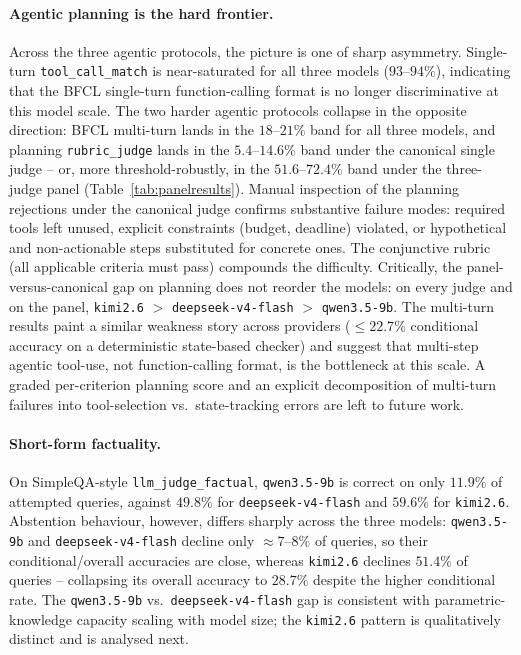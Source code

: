 \documentclass[11pt,a4paper]{article}
\begin{document}
\paragraph{Agentic planning is the hard frontier.} Across the three agentic
protocols, the picture is one of sharp asymmetry. Single-turn
\texttt{tool\_call\_match} is near-saturated for all three models ($93$--$94\%$),
indicating that the BFCL single-turn function-calling format is no longer
discriminative at this model scale. The two harder agentic protocols collapse
in the opposite direction: BFCL multi-turn lands in the $18$--$21\%$ band for
all three models, and planning \texttt{rubric\_judge} lands in the
$5.4$--$14.6\%$ band under the canonical single judge -- or, more
threshold-robustly, in the $51.6$--$72.4\%$ band under the three-judge panel
(Table~\ref{tab:panelresults}). Manual inspection of the planning rejections
under the canonical judge confirms substantive failure modes: required tools
left unused, explicit constraints (budget, deadline) violated, or hypothetical
and non-actionable steps substituted for concrete ones. The conjunctive rubric
(all applicable criteria must pass) compounds the difficulty. Critically, the
panel-versus-canonical gap on planning does not reorder the models: on every
judge and on the panel, \texttt{kimi2.6} $>$ \texttt{deepseek-v4-flash} $>$
\texttt{qwen3.5-9b}. The multi-turn results paint a similar weakness story
across providers ($\le 22.7\%$ conditional accuracy on a deterministic
state-based checker) and suggest that multi-step agentic tool-use, not
function-calling format, is the bottleneck at this scale. A graded
per-criterion planning score and an explicit decomposition of multi-turn
failures into tool-selection vs.\ state-tracking errors are left to future
work.

\paragraph{Short-form factuality.} On SimpleQA-style \texttt{llm\_judge\_factual},
\texttt{qwen3.5-9b} is correct on only $11.9\%$ of attempted queries, against
$49.8\%$ for \texttt{deepseek-v4-flash} and $59.6\%$ for \texttt{kimi2.6}.
Abstention behaviour, however, differs sharply across the three models:
\texttt{qwen3.5-9b} and \texttt{deepseek-v4-flash} decline only $\approx 7$--$8\%$
of queries, so their conditional/overall accuracies are close, whereas
\texttt{kimi2.6} declines $51.4\%$ of queries -- collapsing its overall accuracy
to $28.7\%$ despite the higher conditional rate. The \texttt{qwen3.5-9b} vs.\
\texttt{deepseek-v4-flash} gap is consistent with parametric-knowledge capacity
scaling with model size; the \texttt{kimi2.6} pattern is qualitatively distinct
and is analysed next.
\end{document}
